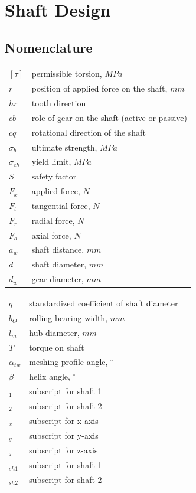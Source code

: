 \chapter{Shaft Design}
\section{Nomenclature}
\begin{tabular}[t]{lp{7cm}}
	$ [\tau] $ & permissible torsion, $ \unit{MPa} $\\
	$ r $ & position of applied force on the shaft, $\unit{mm}$\\
	$ hr $ & tooth direction\\
	$ cb $ & role of gear on the shaft (active or passive)\\
	$ cq $ & rotational direction of the shaft\\
	$ \sigma_b $ & ultimate strength, $ \unit{MPa} $\\
	$ \sigma_{ch} $ & yield limit, $ \unit{MPa} $\\
	$ S $ & safety factor\\
	$ F_x $ & applied force, $ \unit{N} $\\
	$ F_t $ & tangential force, $ \unit{N} $\\
	$ F_r $ & radial force, $ \unit{N} $\\
	$ F_a $ & axial force, $ \unit{N} $\\
	$ a_w $ & shaft distance, $ \unit{mm} $\\
	$ d $ & shaft diameter, $ \unit{mm} $\\
	$ d_w $ & gear diameter, $ \unit{mm} $\\
	
\end{tabular}
\begin{tabular}[t]{lp{7cm}}
	$ q $ & standardized coefficient of shaft diameter\\
	$ b_O $ & rolling bearing width, $ \unit{mm} $\\
	$ l_m $ & hub diameter, $ \unit{mm} $\\
	$ T $ & torque on shaft\\
	$ \alpha_{tw} $ & meshing profile angle, $ ^\circ $\\
	$ \beta $ & helix angle, $ ^\circ $\\
	$ _1 $ & subscript for shaft 1\\
	$ _2 $ & subscript for shaft 2\\
	$ _x $ & subscript for x-axis\\
	$ _y $ & subscript for y-axis\\
	$ _z $ & subscript for z-axis\\
	$ _{sh1} $ & subscript for shaft 1\\
	$ _{sh2} $ & subscript for shaft 2\\
\end{tabular}
